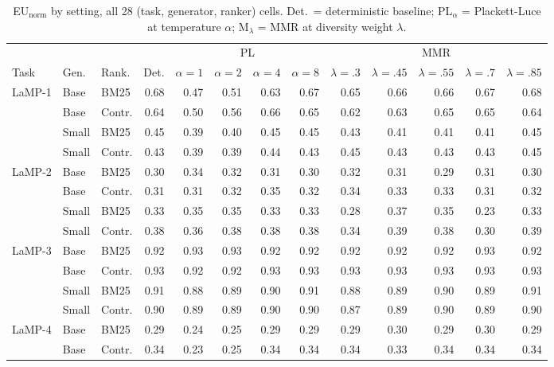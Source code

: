 \documentclass[10pt,twocolumn]{article}
\begin{document}
\begin{table}[t]
\centering
\scriptsize
\setlength{\tabcolsep}{3.2pt}
\caption{EU$_{\text{norm}}$ by setting, all 28 (task, generator, ranker) cells.
Det.\ = deterministic baseline; PL$_\alpha$ = Plackett-Luce at temperature
$\alpha$; M$_\lambda$ = MMR at diversity weight $\lambda$.}
\label{tab:eu-full}
\begin{tabular}{@{}lll rrrrr rrrrr@{}}
\toprule
& & & & \multicolumn{4}{c}{PL} & \multicolumn{5}{c}{MMR} \\
\cmidrule(lr){5-8}\cmidrule(lr){9-13}
Task & Gen. & Rank. & Det. & $\alpha{=}1$ & $\alpha{=}2$ & $\alpha{=}4$ & $\alpha{=}8$
& $\lambda{=}.3$ & $\lambda{=}.45$ & $\lambda{=}.55$ & $\lambda{=}.7$ & $\lambda{=}.85$ \\
\midrule
LaMP-1 & Base & BM25 & 0.68 & 0.47 & 0.51 & 0.63 & 0.67 & 0.65 & 0.66 & 0.66 & 0.67 & 0.68 \\
 & Base & Contr. & 0.64 & 0.50 & 0.56 & 0.66 & 0.65 & 0.62 & 0.63 & 0.65 & 0.65 & 0.64 \\
 & Small & BM25 & 0.45 & 0.39 & 0.40 & 0.45 & 0.45 & 0.43 & 0.41 & 0.41 & 0.41 & 0.45 \\
 & Small & Contr. & 0.43 & 0.39 & 0.39 & 0.44 & 0.43 & 0.45 & 0.43 & 0.43 & 0.43 & 0.45 \\
LaMP-2 & Base & BM25 & 0.30 & 0.34 & 0.32 & 0.31 & 0.30 & 0.32 & 0.31 & 0.29 & 0.31 & 0.30 \\
 & Base & Contr. & 0.31 & 0.31 & 0.32 & 0.35 & 0.32 & 0.34 & 0.33 & 0.33 & 0.31 & 0.32 \\
 & Small & BM25 & 0.33 & 0.35 & 0.35 & 0.33 & 0.33 & 0.28 & 0.37 & 0.35 & 0.23 & 0.33 \\
 & Small & Contr. & 0.38 & 0.36 & 0.38 & 0.38 & 0.38 & 0.34 & 0.39 & 0.38 & 0.30 & 0.39 \\
LaMP-3 & Base & BM25 & 0.92 & 0.93 & 0.93 & 0.92 & 0.92 & 0.92 & 0.92 & 0.92 & 0.93 & 0.92 \\
 & Base & Contr. & 0.93 & 0.92 & 0.92 & 0.93 & 0.93 & 0.93 & 0.93 & 0.93 & 0.93 & 0.93 \\
 & Small & BM25 & 0.91 & 0.88 & 0.89 & 0.90 & 0.91 & 0.88 & 0.89 & 0.90 & 0.89 & 0.91 \\
 & Small & Contr. & 0.90 & 0.89 & 0.89 & 0.90 & 0.90 & 0.87 & 0.89 & 0.90 & 0.89 & 0.90 \\
LaMP-4 & Base & BM25 & 0.29 & 0.24 & 0.25 & 0.29 & 0.29 & 0.29 & 0.30 & 0.29 & 0.30 & 0.29 \\
 & Base & Contr. & 0.34 & 0.23 & 0.25 & 0.34 & 0.34 & 0.34 & 0.33 & 0.34 & 0.34 & 0.34 \\

\end{tabular}
\end{table}
\end{document}
